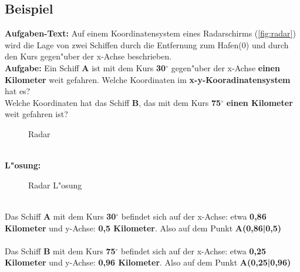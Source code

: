 \documentclass{standalone}
\begin{document}
\subsection{Beispiel}

\textbf{Aufgaben-Text:} Auf einem Koordinatensystem eines Radarschirms (\autoref{fig:radar}) wird die Lage von zwei Schiffen durch die Entfernung zum Hafen(0) und durch den Kurs gegen{"u}ber der x-Achse beschrieben. \\
\textbf{Aufgabe:} Ein Schiff \textbf{A} ist mit dem Kurs \textbf{30$^\circ$} gegen{"u}ber der x-Achse \textbf{einen Kilometer} weit gefahren. Welche Koordinaten im \textbf{x-y-Kooradinatensystem} hat es?\\
Welche Koordinaten hat das Schiff \textbf{B}, das mit dem Kurs \textbf{75$^\circ$} \textbf{einen Kilometer} weit gefahren ist?
\begin{figure}[hb!]
	\centering
	\def\svgwidth{250px}
	
	\caption{Radar}
	\label{fig:radar}
\end{figure}
\\
\noindent
\textbf{L{"o}sung:}
\begin{wrapfigure}[9]{r}{0.5\textwidth}
	\def\svgwidth{250px}
	
	\caption{Radar L{"o}sung}
	\label{fig:radar_loesung}
\end{wrapfigure}
\\
Das Schiff \textbf{A} mit dem Kurs \textbf{30$^\circ$} befindet sich auf der x-Achse: etwa \textbf{0,86 Kilometer} und y-Achse: \textbf{0,5 Kilometer}. Also auf dem Punkt \textbf{A(0,86|0,5)} \\  \\
Das Schiff \textbf{B} mit dem Kurs \textbf{75$^\circ$} befindet sich auf der x-Achse: etwa \textbf{0,25 Kilometer} und y-Achse: \textbf{0,96 Kilometer}. Also auf dem Punkt \textbf{A(0,25|0,96)}
\end{document}
